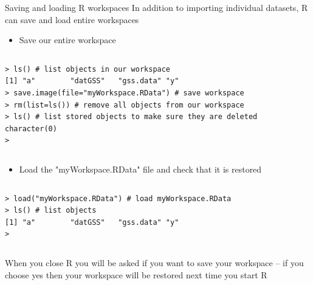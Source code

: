 \documentclass[table,smaller]{beamer}
\begin{document}
\begin{frame}[fragile,label=sec-4-5]{Saving and loading R  workspaces}
 In addition to importing individual datasets, R can save and load entire workspaces
\begin{itemize}
\item Save our entire workspace
\end{itemize}
\vspace{-.5em}
\begin{columns}
\begin{block}{}
\begin{verbatim}
> ls() # list objects in our workspace
[1] "a"        "datGSS"   "gss.data" "y"       
> save.image(file="myWorkspace.RData") # save workspace 
> rm(list=ls()) # remove all objects from our workspace 
> ls() # list stored objects to make sure they are deleted
character(0)
>
\end{verbatim}
\end{block}
\end{columns}
\vspace{.5em}

\begin{itemize}
\item Load the "myWorkspace.RData" file and check that it is restored
\end{itemize}

\vspace{-.5em}
\begin{columns}
\begin{block}{}
\begin{verbatim}
> load("myWorkspace.RData") # load myWorkspace.RData
> ls() # list objects
[1] "a"        "datGSS"   "gss.data" "y"       
>
\end{verbatim}
\end{block}
\end{columns}
\vspace{.5em}

When you close R you will be asked if you want to save your workspace -- if you choose yes then your workspace will be restored next time you start R
\end{frame}
\end{document}
